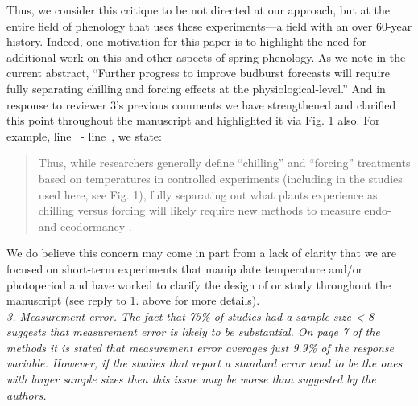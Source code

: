 \documentclass{article}
\newcommand{\lr}[1]{line~\lineref{#1}}
\begin{document}
Thus, we consider this critique to be not directed at our approach, but at the entire field of phenology that uses these experiments---a field with an over 60-year history. Indeed, one motivation for this paper is to highlight the need for additional work on this and other aspects of spring phenology. As we note in the current abstract, ``Further progress to improve budburst forecasts will require fully separating chilling and forcing effects at the physiological-level.'' And in response to reviewer 3's previous comments we have strengthened and clarified this point throughout the manuscript and highlighted it via Fig. 1 also. For example, \lr{whatchillstart} - \lr{whatchillend}, we state:
\begin{quote}
Thus, while researchers generally define ``chilling'' and ``forcing'' treatments based on temperatures in controlled experiments (including in the studies used here, see Fig. 1), fully separating out what plants experience as chilling versus forcing will likely require new methods to measure endo- and ecodormancy \emph{\citep{vanderschoot2014}}. 
\end{quote}
We do believe this concern may come in part from a lack of clarity that we are focused on short-term experiments that manipulate temperature and/or photoperiod and have worked to clarify the design of or study throughout the manuscript (see reply to 1. above for more details).\\

\emph{3. Measurement error. The fact that 75\% of studies had a sample size < 8 suggests that
measurement error is likely to be substantial. On page 7 of the methods it is stated that
measurement error averages just 9.9\% of the response variable. However, if the studies that
report a standard error tend to be the ones with larger sample sizes then this issue may be
worse than suggested by the authors.}\\
\end{document}
